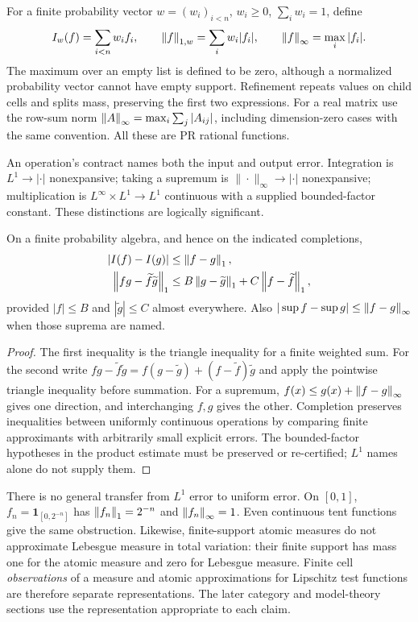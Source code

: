 For a finite probability vector $w=(w_i)_{i<n}$, $w_i\ge0$,
$\sum_iw_i=1$, define
\[
 I_w(f)=\sum_{i<n}w_i f_i,\qquad
 \left\lVert f\right\rVert_{1,w}=\sum_iw_i|f_i|,\qquad
 \left\lVert f\right\rVert_\infty=\max_i|f_i|.
\]
The maximum over an empty list is defined to be zero, although a normalized
probability vector cannot have empty support. Refinement repeats values
on child cells and splits mass, preserving the first two expressions.
For a real matrix use the row-sum norm
$\left\lVert A\right\rVert_\infty=\max_i\sum_j|A_{ij}|$, including dimension-zero cases with
the same convention. All these are PR rational functions.

An operation's contract names both the input and output error. Integration
is $L^1\to|\cdot|$ nonexpansive; taking a supremum is
$\|\cdot\|_\infty\to|\cdot|$ nonexpansive; multiplication is
$L^\infty\times L^1\to L^1$ continuous with a supplied bounded-factor
constant. These distinctions are logically significant.

\begin{proposition}\label{prop:safe-transfers}
On a finite probability algebra, and hence on the indicated completions,
\begin{align}
 |I(f)-I(g)|&\le\left\lVert f-g\right\rVert_1,\label{eq:int-lipschitz}\\
 \left\lVert fg-\widetilde f\widetilde g\right\rVert_1
 &\le B\left\lVert g-\widetilde g\right\rVert_1+C\left\lVert f-\widetilde f\right\rVert_1,
 \label{eq:product-lipschitz}
\end{align}
provided $|f|\le B$ and $|\widetilde g|\le C$ almost everywhere.
Also $|\sup f-\sup g|\le\left\lVert f-g\right\rVert_\infty$ when those suprema are named.
\end{proposition}
\begin{proof}
The first inequality is the triangle inequality for a finite weighted sum.
For the second write $fg-\widetilde f\widetilde g
=f(g-\widetilde g)+(f-\widetilde f)\widetilde g$ and apply the pointwise
triangle inequality before summation. For a supremum, $f(x)\le
g(x)+\left\lVert f-g\right\rVert_\infty$ gives one direction, and interchanging $f,g$ gives
the other. Completion preserves inequalities between uniformly continuous
operations by comparing finite approximants with arbitrarily small explicit
errors. The bounded-factor hypotheses in the product estimate must be
preserved or re-certified; $L^1$ names alone do not supply them.
\end{proof}

There is no general transfer from $L^1$ error to uniform error. On $[0,1]$,
$f_n=\mathbf1_{[0,2^{-n}]}$ has $\left\lVert f_n\right\rVert_1=2^{-n}$ and
$\left\lVert f_n\right\rVert_\infty=1$. Even continuous tent functions give the same
obstruction. Likewise, finite-support atomic measures do not approximate
Lebesgue measure in total variation: their finite support has mass one
for the atomic measure and zero for Lebesgue measure. Finite cell
\emph{observations} of a measure and atomic approximations for Lipschitz
test functions are therefore separate representations. The later category
and model-theory sections use the representation appropriate to each claim.

